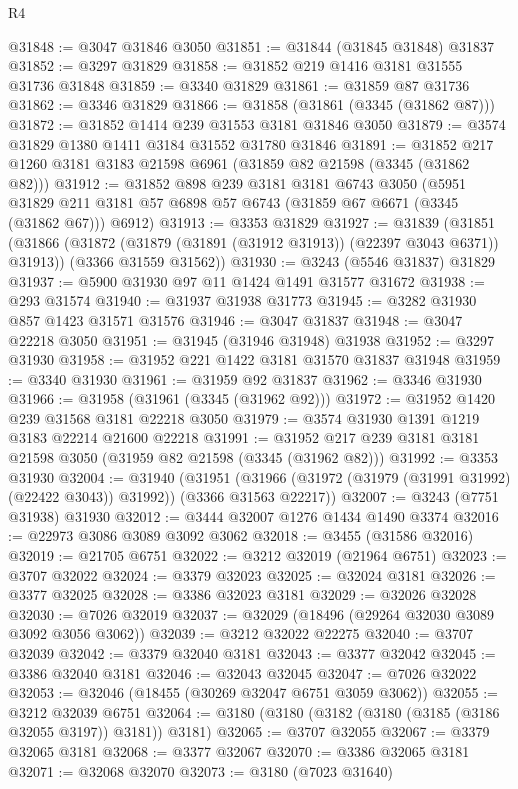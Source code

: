 \begin{lexlean}{R4}
\begin{coremodule}
@31848 := @3047 @31846 @3050
@31851 := @31844 (@31845 @31848) @31837
@31852 := @3297 @31829
@31858 := @31852 @219 @1416 @3181 @31555 @31736 @31848
@31859 := @3340 @31829
@31861 := @31859 @87 @31736
@31862 := @3346 @31829
@31866 := @31858 (@31861 (@3345 (@31862 @87)))
@31872 := @31852 @1414 @239 @31553 @3181 @31846 @3050
@31879 := @3574 @31829 @1380 @1411 @3184 @31552 @31780 @31846
@31891 := @31852 @217 @1260 @3181 @3183 @21598 @6961 (@31859 @82 @21598 (@3345 (@31862 @82)))
@31912 := @31852
    @898
    @239
    @3181
    @3181
    @6743
    @3050
    (@5951 @31829 @211 @3181 @57 @6898 @57 @6743 (@31859 @67 @6671 (@3345 (@31862 @67))) @6912)
@31913 := @3353 @31829
@31927 := @31839
    (@31851
      (@31866 (@31872 (@31879 (@31891 (@31912 @31913)) (@22397 @3043 @6371)) @31913))
      (@3366 @31559 @31562))
@31930 := @3243 (@5546 @31837) @31829
@31937 := @5900 @31930 @97 @11 @1424 @1491 @31577 @31672
@31938 := @293 @31574
@31940 := @31937 @31938 @31773
@31945 := @3282 @31930 @857 @1423 @31571 @31576
@31946 := @3047 @31837
@31948 := @3047 @22218 @3050
@31951 := @31945 (@31946 @31948) @31938
@31952 := @3297 @31930
@31958 := @31952 @221 @1422 @3181 @31570 @31837 @31948
@31959 := @3340 @31930
@31961 := @31959 @92 @31837
@31962 := @3346 @31930
@31966 := @31958 (@31961 (@3345 (@31962 @92)))
@31972 := @31952 @1420 @239 @31568 @3181 @22218 @3050
@31979 := @3574 @31930 @1391 @1219 @3183 @22214 @21600 @22218
@31991 := @31952 @217 @239 @3181 @3181 @21598 @3050 (@31959 @82 @21598 (@3345 (@31962 @82)))
@31992 := @3353 @31930
@32004 := @31940
    (@31951 (@31966 (@31972 (@31979 (@31991 @31992) (@22422 @3043)) @31992)) (@3366 @31563 @22217))
@32007 := @3243 (@7751 @31938) @31930
@32012 := @3444 @32007 @1276 @1434 @1490 @3374
@32016 := @22973 @3086 @3089 @3092 @3062
@32018 := @3455 (@31586 @32016)
@32019 := @21705 @6751
@32022 := @3212 @32019 (@21964 @6751)
@32023 := @3707 @32022
@32024 := @3379 @32023
@32025 := @32024 @3181
@32026 := @3377 @32025
@32028 := @3386 @32023 @3181
@32029 := @32026 @32028
@32030 := @7026 @32019
@32037 := @32029 (@18496 (@29264 @32030 @3089 @3092 @3056 @3062))
@32039 := @3212 @32022 @22275
@32040 := @3707 @32039
@32042 := @3379 @32040 @3181
@32043 := @3377 @32042
@32045 := @3386 @32040 @3181
@32046 := @32043 @32045
@32047 := @7026 @32022
@32053 := @32046 (@18455 (@30269 @32047 @6751 @3059 @3062))
@32055 := @3212 @32039 @6751
@32064 := @3180 (@3180 (@3182 (@3180 (@3185 (@3186 @32055 @3197)) @3181)) @3181)
@32065 := @3707 @32055
@32067 := @3379 @32065 @3181
@32068 := @3377 @32067
@32070 := @3386 @32065 @3181
@32071 := @32068 @32070
@32073 := @3180 (@7023 @31640)

\end{coremodule}
\end{lexlean}
